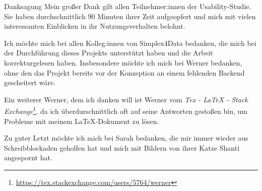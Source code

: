 \vspace*{0pt plus 1fill}
\begin{tucsimplesection}{Danksagung}
  Mein großer Dank gilt allen Teilnehmer:innen der Usability-Studie. Sie haben durchschnittlich 90 Minuten ihrer Zeit aufgeopfert und mich mit vielen interessanten Einblicken in ihr Nutzungsverhalten belohnt.

  Ich möchte mich bei allen Kolleg:innen von Simplex4Data bedanken, die mich bei der Durchführung dieses Projekts unterstützt haben und die Arbeit korrekturgelesen haben. Insbesondere möchte ich mich bei Werner bedanken, ohne den das Projekt bereits vor der Konzeption an einem fehlenden Backend gescheitert wäre.

  Ein weiterer Werner, dem ich danken will ist Werner vom \textit{Tex - LaTeX - Stack Exchange}\footnote{\url{https://tex.stackexchange.com/users/5764/werner}}, da ich überdurschnittlich oft auf seine Antworten gestoßen bin, um Probleme mit meinem \LaTeX{}-Dokument zu lösen.

  Zu guter Letzt möchte ich mich bei Sarah bedanken, die mir immer wieder aus Schreibblockaden geholfen hat und mich mit Bildern von ihrer Katze Shanti angespornt hat.
\end{tucsimplesection}
\vspace*{0pt plus 2.5fill}
